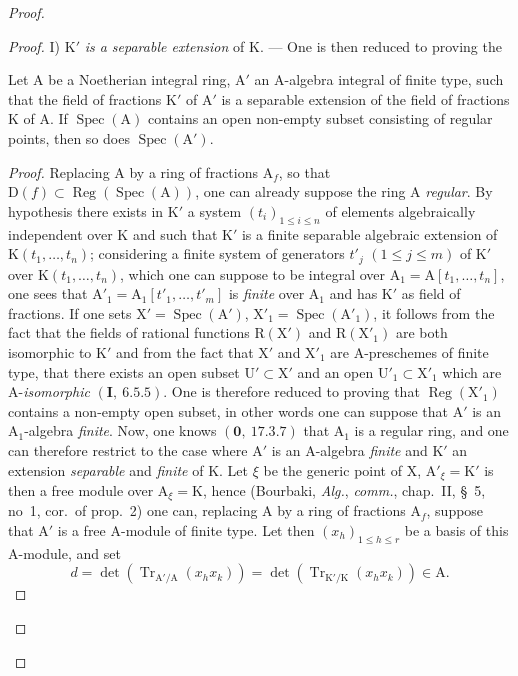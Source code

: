 \begin{proof}
\begin{proof}
I) $\mathrm{K}'$ \emph{is a separable extension} of $\mathrm{K}$. --- One is then reduced to proving the

\begin{lemma}[6.12.4.1]
\label{IV.6.12.4.1}
Let $\mathrm{A}$ be a Noetherian integral ring, $\mathrm{A}'$ an $\mathrm{A}$-algebra integral
of finite type, such that the field of fractions $\mathrm{K}'$ of $\mathrm{A}'$ is a separable extension of the
field of fractions $\mathrm{K}$ of $\mathrm{A}$. If $\operatorname{Spec}(\mathrm{A})$ contains an open non-empty subset consisting of regular points, then
so does $\operatorname{Spec}(\mathrm{A}')$.
\end{lemma}

\begin{proof}
Replacing $\mathrm{A}$ by a ring of fractions $\mathrm{A}_f$, so that $\mathrm{D}(f)\subset\operatorname{Reg}(\operatorname{Spec}(\mathrm{A}))$,
one can already suppose the ring $\mathrm{A}$ \emph{regular}. By hypothesis there exists in $\mathrm{K}'$ a system
$(t_i)_{1\leqslant i\leqslant n}$ of elements algebraically independent over $\mathrm{K}$ and such that $\mathrm{K}'$ is a
finite separable algebraic extension of $\mathrm{K}(t_1,\ldots,t_n)$; considering a finite system
of generators $t'_j$ $(1\leqslant j\leqslant m)$ of $\mathrm{K}'$ over $\mathrm{K}(t_1,\ldots,t_n)$, which one can suppose to be integral
over $\mathrm{A}_1=\mathrm{A}[t_1,\ldots,t_n]$, one sees that $\mathrm{A}'_1=\mathrm{A}_1[t'_1,\ldots,t'_m]$ is \emph{finite} over $\mathrm{A}_1$ and has $\mathrm{K}'$ as
field of fractions. If one sets $\mathrm{X}'=\operatorname{Spec}(\mathrm{A}')$, $\mathrm{X}'_1=\operatorname{Spec}(\mathrm{A}'_1)$, it follows from the fact that the fields
of rational functions $\mathrm{R}(\mathrm{X}')$ and $\mathrm{R}(\mathrm{X}'_1)$ are both isomorphic to $\mathrm{K}'$ and from the fact that $\mathrm{X}'$
and $\mathrm{X}'_1$ are $\mathrm{A}$-preschemes of finite type, that there exists an open subset $\mathrm{U}'\subset\mathrm{X}'$ and an open
$\mathrm{U}'_1\subset\mathrm{X}'_1$ which are $\mathrm{A}$-\emph{isomorphic} $(\mathbf{I},~6.5.5)$. One is therefore reduced to proving that $\operatorname{Reg}(\mathrm{X}'_1)$
contains a non-empty open subset, in other words one can suppose that $\mathrm{A}'$ is an $\mathrm{A}_1$-algebra
\emph{finite}. Now, one knows $(\mathbf{0},~17.3.7)$ that $\mathrm{A}_1$ is a regular ring, and one can therefore restrict to the
case where $\mathrm{A}'$ is an $\mathrm{A}$-algebra \emph{finite} and $\mathrm{K}'$ an extension \emph{separable} and \emph{finite} of $\mathrm{K}$. Let $\xi$ be the
generic point of $\mathrm{X}$, $\mathrm{A}'_\xi=\mathrm{K}'$ is then a free module over $\mathrm{A}_\xi=\mathrm{K}$, hence (Bourbaki, \emph{Alg.},
\emph{comm.}, chap.~II, \S~5, no~1, cor.\ of prop.~2) one can, replacing $\mathrm{A}$ by a ring of fractions $\mathrm{A}_f$,
suppose that $\mathrm{A}'$ is a free $\mathrm{A}$-module of finite type. Let then $(x_h)_{1\leqslant h\leqslant r}$ be a basis of
this $\mathrm{A}$-module, and set
\[
  d=\det(\operatorname{Tr}_{\mathrm{A}'/\mathrm{A}}(x_h x_k))=\det(\operatorname{Tr}_{\mathrm{K}'/\mathrm{K}}(x_h x_k))\in\mathrm{A}.
\]


\end{proof}
\end{proof}
\end{proof}
